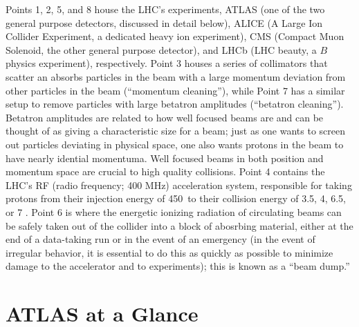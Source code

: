 \begin{landscape}
\begin{figure}[!htbp]\captionsetup{justification=centering}
  \centering
  \begin{subfigure}[t]{0.4950000\linewidth}\centering\texttt{[image: figures/atlas/lhcschematic]}}\caption{}\end{subfigure}
  \begin{subfigure}[t]{0.4950000\linewidth}\centering\texttt{[image: figures/atlas/fig\_LHC\_area\_overview]}}\caption{}\end{subfigure}
  \caption{Schematic and detailed views of the LHC ring. IC: \cite{lhccartoon}, \cite{lhcdetail}}
  \label{fig:lhcring}
\end{figure}
\end{landscape}

Points 1, 2, 5, and 8 house the LHC's experiments, ATLAS (one of the two general purpose detectors, discussed in detail below), ALICE (A Large Ion Collider Experiment, a dedicated heavy ion experiment), CMS (Compact Muon Solenoid, the other general purpose detector), and LHCb (LHC beauty, a $B$ physics experiment), respectively.  Point 3 houses a series of collimators that scatter an absorbs particles in the beam with a large momentum deviation from other particles in the beam (``momentum cleaning''), while Point 7 has a similar setup to remove particles with large betatron amplitudes (``betatron cleaning'').  Betatron amplitudes are related to how well focused beams are and can be thought of as giving a characteristic size for a beam; just as one wants to screen out particles deviating in physical space, one also wants protons in the beam to have nearly idential  momentuma.  Well focused beams in both position and momentum space are crucial to high quality collisions.  Point 4 contains the LHC's RF (radio frequency; 400 MHz) acceleration system, responsible for taking protons from their injection energy of 450 \GeV\,to their collision energy of 3.5, 4, 6.5, or 7 \TeV.  Point 6 is where the energetic ionizing radiation of circulating beams can be safely taken out of the collider into a block of abosrbing material, either at the end of a data-taking run or in the event of an emergency (in the event of irregular behavior, it is essential to do this as quickly as possible to minimize damage to the accelerator and to experiments); this is known as a ``beam dump.''

\section{ATLAS at a Glance}
